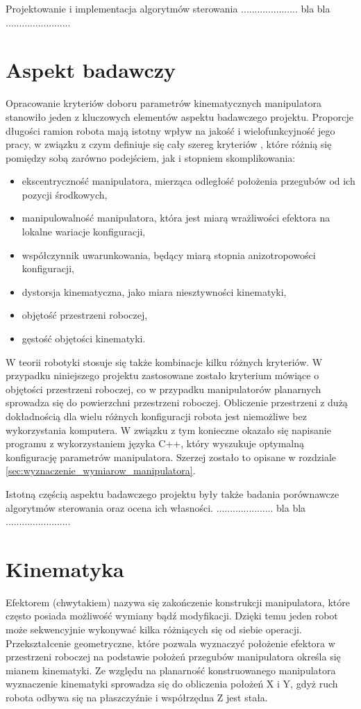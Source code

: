 \documentclass[printmode]{mgr}
\begin{document}
Projektowanie i implementacja algorytmów sterowania ..................... bla bla ........................

\section{Aspekt badawczy}\label{sec:aspekt_badawczy}
Opracowanie kryteriów doboru parametrów kinematycznych manipulatora stanowiło jeden z kluczowych elementów aspektu badawczego projektu.
Proporcje długości ramion robota mają istotny wpływ na jakość i wielofunkcyjność jego pracy, w związku z czym definiuje się cały
szereg kryteriów \cite{miary_jakosci}, które różnią się pomiędzy sobą zarówno podejściem, jak i stopniem skomplikowania:
\begin{itemize}
\item ekscentryczność manipulatora, mierząca odległość położenia przegubów od ich pozycji środkowych,
\item manipulowalność manipulatora, która jest miarą wrażliwości efektora na lokalne wariacje konfiguracji,
\item współczynnik uwarunkowania, będący miarą stopnia anizotropowości konfiguracji,
\item dystorsja kinematyczna, jako miara niesztywności kinematyki,
\item objętość przestrzeni roboczej,
\item gęstość objętości kinematyki.
\end{itemize}
W teorii robotyki stosuje się także kombinacje kilku różnych kryteriów. W przypadku niniejszego projektu zastosowane zostało
kryterium mówiące o objętości przestrzeni roboczej, co w przypadku manipulatorów planarnych sprowadza się do powierzchni przestrzeni roboczej. 
Obliczenie przestrzeni z dużą dokładnością dla wielu różnych konfiguracji robota jest niemożliwe bez wykorzystania komputera. W związku
z tym konieczne okazało się napisanie programu z wykorzystaniem języka C++, który wyszukuje optymalną konfigurację parametrów manipulatora. 
Szerzej zostało to opisane w rozdziale \ref{sec:wyznaczenie_wymiarow_manipulatora}.

Istotną częścią aspektu badawczego projektu były także badania porównawcze algorytmów sterowania oraz ocena ich własności.
..................... bla bla ........................


\section{Kinematyka}
Efektorem (chwytakiem) nazywa się zakończenie konstrukcji manipulatora, które często posiada możliwość wymiany bądź modyfikacji. 
Dzięki temu jeden robot może sekwencyjnie wykonywać kilka różniących się od siebie operacji. Przekształcenie geometryczne,
które pozwala wyznaczyć położenie efektora w przestrzeni roboczej na podstawie położeń przegubów manipulatora określa się mianem kinematyki. 
Ze względu na planarność konstruowanego manipulatora wyznaczenie kinematyki sprowadza się do obliczenia położeń X i Y, gdyż
ruch robota odbywa się na płaszczyźnie i współrzędna Z jest stała.
\end{document}
